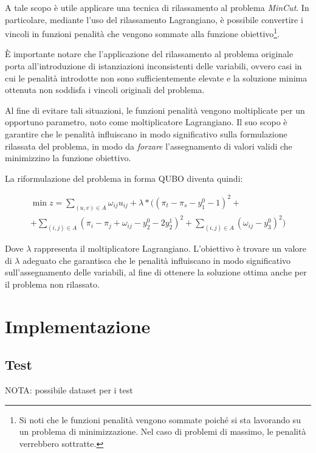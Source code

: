 \documentclass{article}
\begin{document}
A tale scopo è utile applicare una tecnica di rilassamento al problema \emph{MinCut}. In particolare, mediante l'uso del rilassamento Lagrangiano, è possibile convertire i vincoli in funzioni penalità che vengono sommate alla funzione obiettivo\footnote{Si noti che le funzioni penalità vengono sommate poiché si sta lavorando su un problema di minimizzazione. Nel caso di problemi di massimo, le penalità verrebbero sottratte.}.

È importante notare che l'applicazione del rilassamento al problema originale porta all'introduzione di istanziazioni inconsistenti delle variabili, ovvero casi in cui le penalità introdotte non sono sufficientemente elevate e la soluzione minima ottenuta non soddisfa i vincoli originali del problema.

Al fine di evitare tali situazioni, le funzioni penalità vengono moltiplicate per un opportuno parametro, noto come moltiplicatore Lagrangiano. Il suo scopo è garantire che le penalità influiscano in modo significativo sulla formulazione rilassata del problema, in modo da \emph{forzare} l'assegnamento di valori validi che minimizzino la funzione obiettivo.

La riformulazione del problema in forma QUBO diventa quindi:

\begin{center}
    \begin{multline*}
        \min z = \sum_{(u, v) \in A} \omega_{ij}u_{ij} + \lambda*((\pi_t - \pi_s - y_1^0 - 1)^2 +
        \\+ \sum_{(i, j) \in A}(\pi_i - \pi_j + \omega_{ij} - y_2^0 - 2y_2^1)^2 + \sum_{(i, j) \in A}(\omega_{ij} - y_3^0)^2)
    \end{multline*}    
\end{center}

Dove $\lambda$ rappresenta il moltiplicatore Lagrangiano. L'obiettivo è trovare un valore di $\lambda$ adeguato che garantisca che le penalità influiscano in modo significativo sull'assegnamento delle variabili, al fine di ottenere la soluzione ottima anche per il problema non rilassato.

\section{Implementazione}

\subsection{Test}
NOTA: possibile dataset per i test \cite{Jensen2022}




\end{document}
